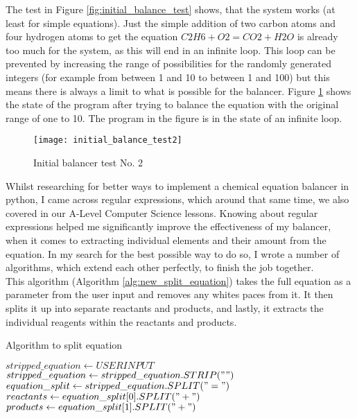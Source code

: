 \documentclass[a4paper,12pt]{article}
\begin{document}
The test in Figure \ref{fig:initial_balance_test} shows, that the system works (at least for simple equations). Just the simple addition of two carbon atoms and four hydrogen atoms to get the equation $ C2H6 + O2 = CO2 + H2O$ is already too much for the system, as this will end in an infinite loop. This loop can be prevented by increasing the range of possibilities for the randomly generated integers (for example from between 1 and 10 to between 1 and 100) but this means there is always a limit to what is possible for the balancer. Figure \ref{fig:second_balance_test} shows the state of the program after trying to balance the equation with the original range of one to 10. The program in the figure is in the state of an infinite loop.

\begin{figure} [h]
	\centering
	\texttt{[image: initial\_balance\_test2]}
	\caption{Initial balancer test No. 2}
	\label{fig:second_balance_test}
\end{figure}

\newpage

Whilst researching for better ways to implement a chemical equation balancer in python, I came across regular expressions, which around that same time, we also covered in our A-Level Computer Science lessons. Knowing about regular expressions helped me significantly improve the effectiveness of my balancer, when it comes to extracting individual elements and their amount from the equation. In my search for the best possible way to do so, I wrote a number of algorithms, which extend each other perfectly, to finish the job together.\\
This algorithm (Algorithm \ref{alg:new_split_equation}) takes the full equation as a parameter from the user input and removes any whites paces from it. It then splits it up into separate reactants and products, and lastly, it extracts the individual reagents within the reactants and products.
\begin{algorithm}
\caption{Algorithm to split equation}\label{alg:new_split_equation}
\begin{algorithmic}
\State $ stripped\_equation \gets USERINPUT$
\State $ stripped\_equation \gets stripped\_equation.STRIP(" ")$
\State $ equation\_split \gets stripped\_equation.SPLIT("=")$
\State $ reactants \gets equation\_split[0].SPLIT("+")$
\State $ products \gets equation\_split[1].SPLIT("+")$
\EndFunction
\end{algorithmic}
\end{algorithm}
\end{document}
